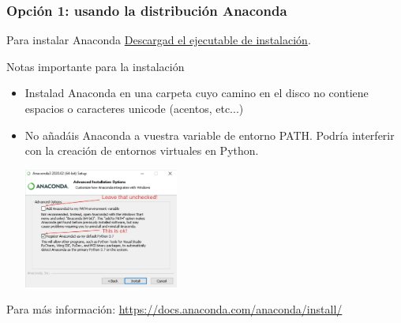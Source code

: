 \documentclass[9pt]{beamer}
\begin{document}
        \begin{frame}
            \frametitle{Opción 1: usando la distribución Anaconda}
            \begin{block}{Para instalar Anaconda}
              \href{https://www.anaconda.com/products/individual}{Descargad
                el ejecutable de instalación}.
              
            \end{block}
            \pause
            \begin{block}{Notas importante para la instalación}
              \begin{itemize}
              \item Instalad  Anaconda en una carpeta cuyo camino en
                el disco no contiene espacios o caracteres unicode
                (acentos, etc...)
              \item
                No añadáis Anaconda a vuestra variable de entorno
                PATH. Podría interferir con la creación de entornos
                virtuales en Python.             
                
                \begin{center}
                  \includegraphics[width=0.4\textwidth]{anaconda_installation_path}
                  
                \end{center}

              \end{itemize}\medskip
              
              
            \end{block}
            Para más información: \href{https://docs.anaconda.com/anaconda/install/}{https://docs.anaconda.com/anaconda/install/}
          \end{frame}
\end{document}
